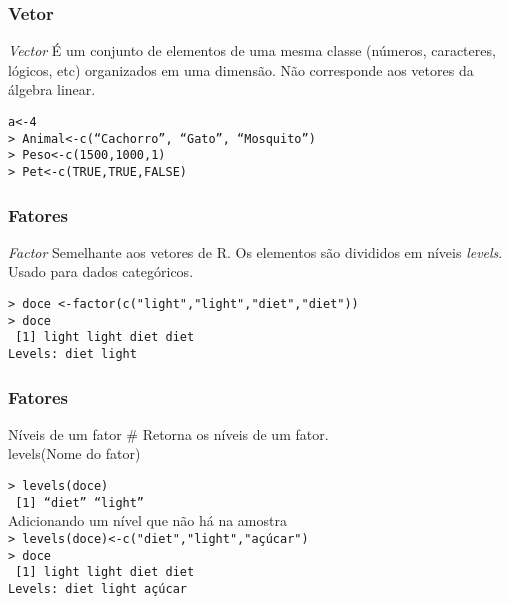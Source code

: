 \documentclass[handout]{beamer}
\begin{document}
  \begin{frame}
    \frametitle{Vetor}
    \begin{block}{\textit{Vector}}
     É um conjunto de elementos de uma mesma classe
      (números, caracteres, lógicos, etc) organizados em uma
      dimensão. Não corresponde aos vetores da álgebra linear.
    \end{block}
\vspace{10pt}
\texttt{a<-4\\
> Animal<-c(``Cachorro'', ``Gato'', ``Mosquito'')\\
> Peso<-c(1500,1000,1)\\
> Pet<-c(TRUE,TRUE,FALSE)\\}
  \end{frame}
  \begin{frame}
    \frametitle{Fatores}
    \begin{block}{\textit{Factor}}
     Semelhante aos vetores de R. Os elementos são divididos  em níveis  \textit{levels}. Usado para dados categóricos.      
    \end{block} 
\vspace{10pt}
\texttt{> doce <-factor(c("light","light","diet","diet")) \\
> doce \\
~[1] light light diet  diet \\
Levels: diet light}
  \end{frame}
  \begin{frame}
    \frametitle{Fatores}
    \begin{block}{Níveis de um fator}
        \# Retorna os níveis de um fator. \\
        levels(Nome do fator)
    \end{block}
\vspace{10pt}
\texttt{> levels(doce)\\
~[1] ``diet''   ``light''}\\
\vspace{10pt}
Adicionando um nível que não há na amostra \\ 
\texttt{> levels(doce)<-c("diet","light","açúcar")\\
> doce \\
~[1] light light diet  diet \\
Levels: diet light açúcar}
  \end{frame}
\end{document}
